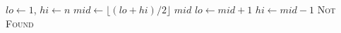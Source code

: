 \begin{algorithm}[h]
\caption{Binary search}
\begin{algorithmic}[1]
  \State $lo \gets 1$, $hi \gets n$
    \State $mid \gets \lfloor (lo + hi)/2 \rfloor$
     \State \Return $mid$ \EndIf
     \State $lo \gets mid + 1$
    \Else \State $hi \gets mid - 1$ \EndIf
  \EndWhile
  \State \Return \textsc{Not Found}
\end{algorithmic}
\end{algorithm}







